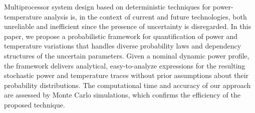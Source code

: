 Multiprocessor system design based on deterministic techniques for power-temperature analysis is, in the context of current and future technologies, both unreliable and inefficient since the presence of uncertainty is disregarded. In this paper, we propose a probabilistic framework for quantification of power and temperature variations that handles diverse probability laws and dependency structures of the uncertain parameters. Given a nominal dynamic power profile, the framework delivers analytical, easy-to-analyze expressions for the resulting stochastic power and temperature traces without prior assumptions about their probability distributions. The computational time and accuracy of our approach are assessed by Monte Carlo simulations, which confirms the efficiency of the proposed technique.
